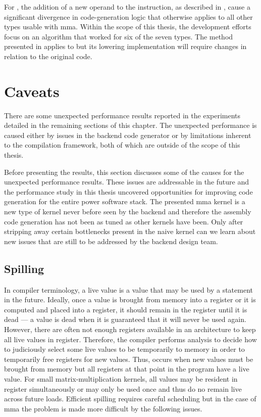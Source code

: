 \documentclass[\main/thesis.tex]{subfiles}
\begin{document}
For , the addition of a new operand to the instruction, as described in , cause a significant divergence in code-generation logic that otherwise applies to all other types usable with \gls{mma}.
Within the scope of this thesis, the development efforts focus on an algorithm that worked for six of the seven types.
The method presented in  applies to  but its \gls{lowering} implementation will require changes in relation to the original code.

\section{Caveats}
\label{sec:caveats}
There are some unexpected performance results reported in the experiments detailed in the remaining sections of this chapter.
The unexpected performance is caused either by issues in the backend code generator or by limitations inherent to the compilation framework, both of which are outside of the scope of this thesis.

Before presenting the results, this section discusses some of the causes for the unexpected performance results.
These issues are addressable in the future and the performance study in this thesis uncovered opportunities for improving code generation for the entire \gls{power} software stack.
The presented \gls{mma} kernel is a new type of kernel never before seen by the backend and therefore the assembly code generation has not been as tuned as other kernels have been.
Only after stripping away certain bottlenecks present in the naive kernel can we learn about new issues that are still to be addressed by the backend design team.

\subsection{Spilling}
In compiler terminology, a \gls{live} value is a value that may be used by a statement in the future.
Ideally, once a value is brought from memory into a register or it is computed and placed into a register, it should remain in the register until it is \gls{dead} --- a value is dead when it is guaranteed that it will never be used again.
However, there are often not enough registers available in an architecture to keep all live values in register.
Therefore, the compiler performs analysis to decide how to judiciously select some live values to be temporarily  to memory in order to temporarily free registers for new values.
Thus,  occurs when new values must be brought from memory but all registers at that \gls{point} in the program have a \gls{live} value.
For small matrix-multiplication kernels, all values may be resident in register simultaneously or may only be used once and thus do no remain \gls{live} across future loads.
Efficient spilling requires careful scheduling but in the case of \gls{mma} the problem is made more difficult by the following issues.
\end{document}
